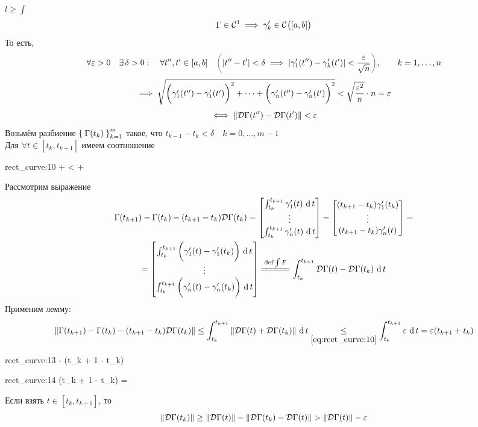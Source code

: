 \begin{iproof}
	\item $ l \ge \int $
	$$ \Gamma \in \mc C^1 \implies \gamma_k' \in \Cont{[a, b]} $$
	То есть,
	$$ \forall \veps > 0 \quad \exist \delta > 0 : \quad \forall t'', t' \in [a, b] \quad \nimp[\bigg(] |t'' - t'| < \delta \implies |\gamma_1'(t'') - \gamma_k'(t')| < \frac\veps{\sqrt n} \nimp[\bigg)], \qquad k = 1, \dots, n $$
	$$ \implies \sqrt{\bigg( \gamma_1'(t'') - \gamma_1'(t') \bigg)^2 + \dots + \bigg( \gamma_n'(t'') - \gamma_n'(t') \bigg)^2} < \sqrt{\frac{\veps^2}n} \cdot n = \veps $$
	$$ \iff \norm{\mc D\Gamma(t'') - \mc D\Gamma(t')} < \veps $$
	Возьмём разбиение $ \seq[m]{\Gamma(t_k)}k $ такое, что $ t_{k - 1} - t_k < \delta \quad k = 0, \dots, m - 1 $ \\
	Для $ \forall t \in [t_k, t_{k + 1}] $ имеем соотношение
	\begin{equ}{rect_curve:10}
		 \trile {} +  <  + \veps
	\end{equ}
	Рассмотрим выражение
	\begin{multline*}
		\Gamma(t_{k + 1}) - \Gamma(t_k) - (t_{k + 1} - t_k)\mc D\Gamma(t_k) = \column{\dint[t]{t_k}{t_{k + 1}}{\gamma_1'(t)}}{\dint[t]{t_k}{t_{k + 1}}{\gamma_n'(t)}} - \column{(t_{k + 1} - t_k)\gamma_1'(t_k)}{(t_{k + 1} - t_k)\gamma_n'(t)} = \\
		= \column{\dint[t]{t_k}{t_{k + 1}}{ \bigg( \gamma_1'(t) - \gamma_1'(t_k) \bigg)}}{\dint[t]{t_k}{t_{k + 1}}{ \bigg( \gamma_n'(t) - \gamma_n'(t_k) \bigg)}} \bdefeq{\int F} \dint[t]{t_k}{t_{k + 1}}{\mc D\Gamma(t) - \mc D\Gamma(t_k)}
	\end{multline*}
	Применим лемму:
	$$ \norm{\Gamma(t_{k + 1}) - \Gamma(t_k) - (t_{k + 1} - t_k)\mc D\Gamma(t_k)} \le \dint[t]{t_k}{t_{k + 1}}{\norm{\mc D\Gamma(t) + \mc D\Gamma(t_k)}} \underset{\eref{rect_curve:10}}\le \dint[t]{t_k}{t_{k + 1}}\veps = \veps(t_{k + 1} + t_k) $$
	\begin{equ}{rect_curve:13}
		\implies {} \trige {} - \veps (t_{k + 1} - t_k)
	\end{equ}
	\begin{equ}{rect_curve:14}
		(t_{k + 1} - t_k)  = 
	\end{equ}
	Если взять $ t \in [t_k, t_{k + 1}] $, то
	$$ \norm{\mc D \Gamma(t_k)} \ge \norm{\mc D\Gamma(t)} - \norm{\mc D\Gamma(t_k) - \mc D \Gamma(t)} > \norm{\mc D \Gamma(t)} - \veps $$

\end{iproof}
